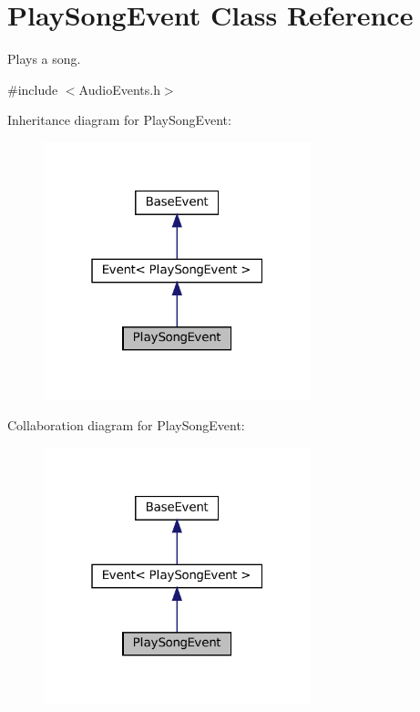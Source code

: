 \hypertarget{classPlaySongEvent}{}\section{Play\+Song\+Event Class Reference}
\label{classPlaySongEvent}


Plays a song.  




{\ttfamily \#include $<$Audio\+Events.\+h$>$}



Inheritance diagram for Play\+Song\+Event\+:
\nopagebreak
\begin{figure}[H]
\begin{center}
\leavevmode
\includegraphics[width=220pt]{classPlaySongEvent__inherit__graph}
\end{center}
\end{figure}


Collaboration diagram for Play\+Song\+Event\+:
\nopagebreak
\begin{figure}[H]
\begin{center}
\leavevmode
\includegraphics[width=220pt]{classPlaySongEvent__coll__graph}
\end{center}
\end{figure}

